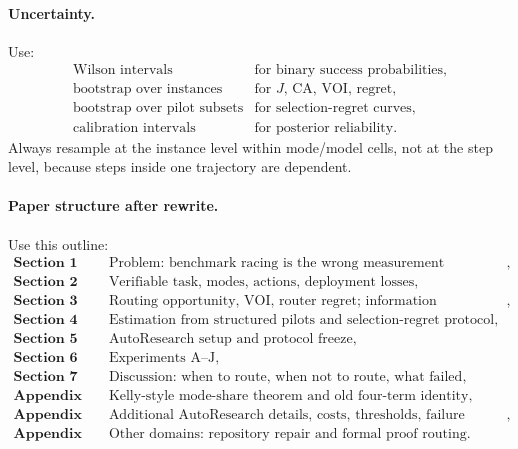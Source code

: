 \documentclass{article}
\begin{document}
\paragraph{Uncertainty.}
Use:
\[
\begin{array}{ll}
    \text{Wilson intervals} & \text{for binary success probabilities},\\
    \text{bootstrap over instances} & \text{for \(J\), \(\mathrm{CA}\), \(\mathrm{VOI}\), regret},\\
    \text{bootstrap over pilot subsets} & \text{for selection-regret curves},\\
    \text{calibration intervals} & \text{for posterior reliability}.
\end{array}
\]
Always resample at the instance level within mode/model cells, not at the step level, because
steps inside one trajectory are dependent.

\paragraph{Paper structure after rewrite.}
Use this outline:
\[
\begin{array}{ll}
    \textbf{Section 1} &
    \text{Problem: benchmark racing is the wrong measurement instrument},\\
    \textbf{Section 2} &
    \text{Verifiable task, modes, actions, deployment losses},\\
    \textbf{Section 3} &
    \text{Routing opportunity, VOI, router regret; information diagnostics},\\
    \textbf{Section 4} &
    \text{Estimation from structured pilots and selection-regret protocol},\\
    \textbf{Section 5} &
    \text{AutoResearch setup and protocol freeze},\\
    \textbf{Section 6} &
    \text{Experiments A--J},\\
    \textbf{Section 7} &
    \text{Discussion: when to route, when not to route, what failed},\\
    \textbf{Appendix A} &
    \text{Kelly-style mode-share theorem and old four-term identity},\\
    \textbf{Appendix B} &
    \text{Additional AutoResearch details, costs, thresholds, failure handling},\\
    \textbf{Appendix C} &
    \text{Other domains: repository repair and formal proof routing}.
\end{array}
\]
\end{document}
